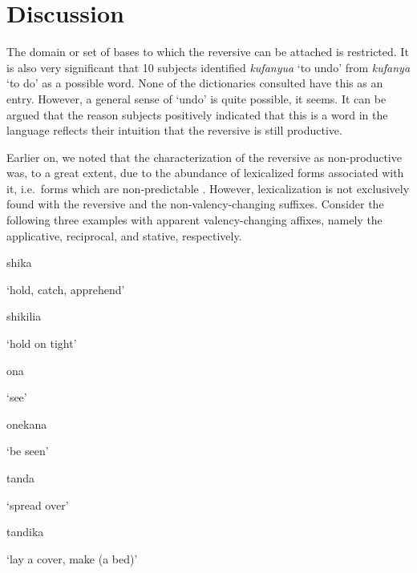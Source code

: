 \documentclass[output=paper]{langsci/langscibook}
\begin{document}
\section{Discussion}\label{sec:ngonyaningowa:5}

The domain or set of bases to which the reversive can be attached \citep{HaspelmathSims2010} is restricted. It is also very significant that 10 subjects identified \textit{kufanyua} ‘to undo’ from \textit{kufanya} ‘to do’ as a possible word. None of the dictionaries consulted have this as an entry. However, a general sense of ‘undo’ is quite possible, it seems. It can be argued that the reason subjects positively indicated that this is a word in the language reflects their intuition that the reversive is still productive. 

Earlier on, we noted that the characterization of the reversive as non-productive was, to a great extent, due to the abundance of lexicalized forms associated with it, i.e.\ forms which are non-predictable \citep{Shepardson1986}. However, lexicalization is not exclusively found with the reversive and the non-valency-changing suffixes. Consider the following three examples with apparent valency-changing affixes, namely the applicative, reciprocal, and stative, respectively. 

\ea\label{ex:ngonyaningowa:11}
\ea\label{ex:ngonyaningowa:11a}
{shika}

  ‘hold, catch, apprehend’

\ex\label{ex:ngonyaningowa:11b} 
shikilia

  ‘hold on tight’
\z
\z 

\ea\label{ex:ngonyaningowa:12}
\ea\label{ex:ngonyaningowa:12a}
ona

  ‘see’

\ex\label{ex:ngonyaningowa:12b}  
onekana

  ‘be seen’
\z 
\z 

\ea\label{ex:ngonyaningowa:13}
\ea\label{ex:ngonyaningowa:13a}
tanda

  ‘spread over’

\ex\label{ex:ngonyaningowa:13b}  
tandika

 ‘lay a cover, make (a bed)’
\z 
\z
\end{document}
